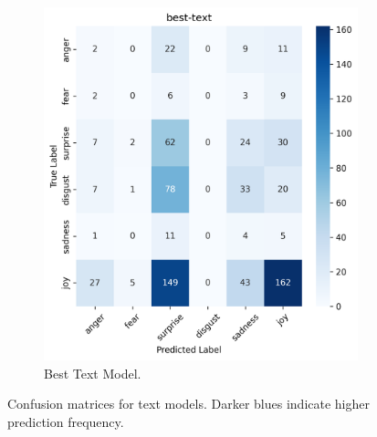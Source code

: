 \begin{figure}[h]
\begin{subfigure}[b]{0.48\textwidth}
        \includegraphics[width=\textwidth]{images/confusion_matrix_best_text_dist.png}
        \caption{Best Text Model.}
        \label{fig:text-confusion-best}
    \end{subfigure}
    \caption{Confusion matrices for text models. Darker blues indicate higher prediction frequency.}
    \label{fig:text-confusion}
\end{figure}

